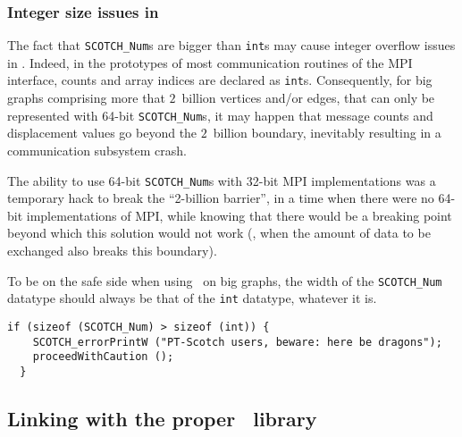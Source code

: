 \subsubsection{Integer size issues in \ptscotch}

The fact that \texttt{SCOTCH\_\lbt Num}s are bigger than \texttt{int}s
may cause integer overflow issues in \ptscotch. Indeed, in the
prototypes of most communication routines of the MPI interface, counts
and array indices are declared as \texttt{int}s. Consequently, for big
graphs comprising more that $2$~billion vertices and/or edges, that
can only be represented with 64-bit \texttt{SCOTCH\_\lbt Num}s, it may
happen that message counts and displacement values go beyond the
$2$~billion boundary, inevitably resulting in a communication
subsystem crash.

The ability to use 64-bit \texttt{SCOTCH\_\lbt Num}s with 32-bit MPI
implementations was a temporary hack to break the ``2-billion
barrier'', in a time when there were no 64-bit implementations of MPI,
while knowing that there would be a breaking point beyond which this
solution would not work (\ie, when the amount of data to be exchanged
also breaks this boundary).

To be on the safe side when using \ptscotch\ on big graphs, the width
of the \texttt{SCOTCH\_\lbt Num} datatype should always be that of the
\texttt{int} datatype, whatever it is.

\begin{center}
\end{center}

\begin{lstlisting}[style=language-c]
  if (sizeof (SCOTCH_Num) > sizeof (int)) {
    SCOTCH_errorPrintW ("PT-Scotch users, beware: here be dragons");
    proceedWithCaution ();
  }
\end{lstlisting}

\subsection{Linking with the proper \scotch\ library}

